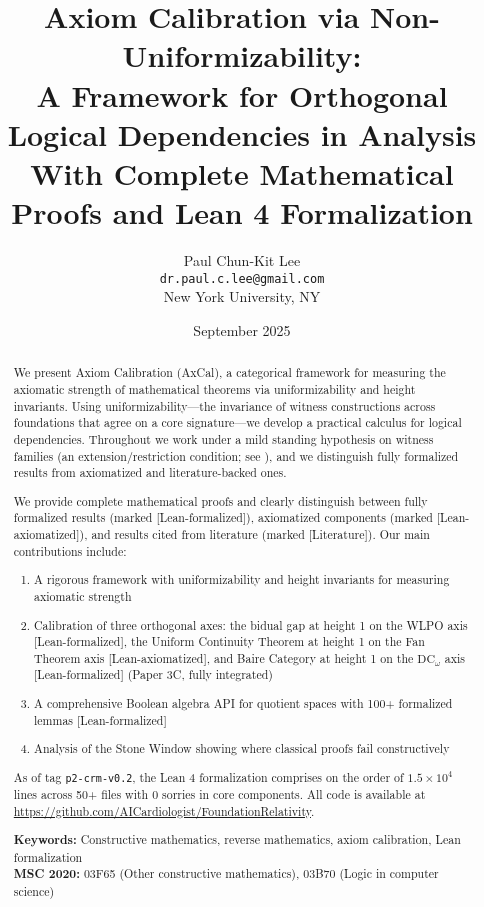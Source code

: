 \documentclass[11pt]{article}
\title{Axiom Calibration via Non-Uniformizability:\\
A Framework for Orthogonal Logical Dependencies in Analysis\\
\Large{With Complete Mathematical Proofs and Lean 4 Formalization}}
\author{Paul Chun-Kit Lee\\
\texttt{dr.paul.c.lee@gmail.com}\\
New York University, NY}
\date{September 2025}
\theoremstyle{plain}
\theoremstyle{definition}
\newcommand{\DCw}{\mathrm{DC}_\omega}
\newcommand{\leanok}{\textsf{\textcolor{green!70!black}{[Lean-formalized]}}}
\newcommand{\leanaxiom}{\textsf{\textcolor{orange!80!black}{[Lean-axiomatized]}}}
\newcommand{\leancited}{\textsf{\textcolor{blue!70!black}{[Literature]}}}
\begin{document}
\maketitle

\begin{abstract}
We present Axiom Calibration (AxCal), a categorical framework for measuring the axiomatic strength of mathematical theorems via uniformizability and height invariants. Using uniformizability—the invariance of witness constructions across foundations that agree on a core signature—we develop a practical calculus for logical dependencies. Throughout we work under a mild standing hypothesis on witness families (an extension/restriction condition; see ), and we distinguish fully formalized results from axiomatized and literature-backed ones. 

We provide complete mathematical proofs and clearly distinguish between fully formalized results (marked \leanok), axiomatized components (marked \leanaxiom), and results cited from literature (marked \leancited). Our main contributions include:
\begin{enumerate}
\item A rigorous framework with uniformizability and height invariants for measuring axiomatic strength
\item Calibration of three orthogonal axes: the bidual gap at height 1 on the WLPO axis \leanok, the Uniform Continuity Theorem at height 1 on the Fan Theorem axis \leanaxiom, and Baire Category at height 1 on the $\DCw$ axis \leanok{} (Paper 3C, fully integrated)
\item A comprehensive Boolean algebra API for quotient spaces with 100+ formalized lemmas \leanok
\item Analysis of the Stone Window showing where classical proofs fail constructively
\end{enumerate}

As of tag \texttt{p2-crm-v0.2}, the Lean 4 formalization comprises on the order of $1.5\times 10^4$ lines across 50+ files with 0 sorries in core components. All code is available at \url{https://github.com/AICardiologist/FoundationRelativity}.

\vspace{0.5em}
\noindent\textbf{Keywords:} Constructive mathematics, reverse mathematics, axiom calibration, Lean formalization\\
\textbf{MSC 2020:} 03F65 (Other constructive mathematics), 03B70 (Logic in computer science)
\end{abstract}
\end{document}
